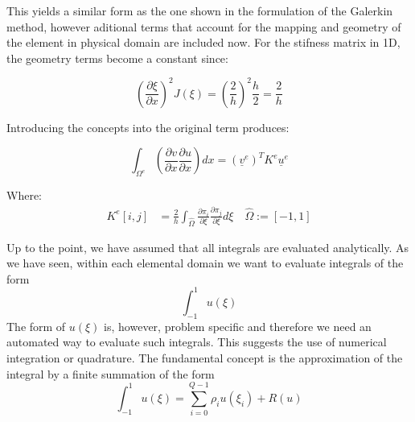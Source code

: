 \documentclass[
]{scrartcl}
\begin{document}
This yields a similar form as the one shown in the formulation of the
Galerkin method, however aditional terms that account for the mapping
and geometry of the element in physical domain are included now. For the
stifness matrix in 1D, the geometry terms become a constant since:

\begin{equation}
(\frac{\partial \xi}{\partial x})^{2} J(\xi)= (\frac{2}{h})^{2}\frac{h}{2}=\frac{2}{h} 
\end{equation}

Introducing the concepts into the original term produces:

\begin{equation}
\int_{\Omega^{e}} ( \frac{\partial v}{\partial x}\frac{\partial u}{\partial x})dx =(\underline{v}^{e})^{T}K^{e}\underline{u}^{e}
\end{equation}

Where: \begin{align}
K^{e}[i,j]&=\frac{2}{h}\int_{\hat{\Omega}}\frac{\partial \pi_{i}}{\partial\xi}\frac{\partial \pi_{j}}{\partial\xi} d\xi \quad \hat{\Omega} := [-1,1] 
\end{align}

Up to the point, we have assumed that all integrals are evaluated
analytically. As we have seen, within each elemental domain we want to
evaluate integrals of the form \begin{equation}
\int_{-1}^{1}u(\xi)
\end{equation} The form of \(u(\xi)\) is, however, problem specific and
therefore we need an automated way to evaluate such integrals. This
suggests the use of numerical integration or quadrature. The fundamental
concept is the approximation of the integral by a finite summation of
the form \begin{equation}
\int_{-1}^{1}u(\xi) = \sum_{i=0}^{Q-1}\rho_iu(\xi_i)+R(u)
\end{equation}
\end{document}
